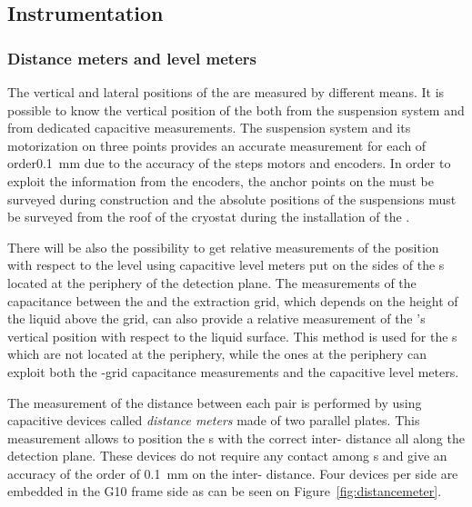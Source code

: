\subsection{Instrumentation}
\label{sec:fddp-crp-instr}

\subsubsection{Distance meters and level meters}

The vertical and lateral positions of the  are measured by different means. 
It is possible to know the vertical position of the  both from the suspension system and from dedicated capacitive measurements.
The  suspension system and its motorization on three points provides an accurate measurement for each  of order\SI{0.1}{mm} due to the accuracy of the steps motors and encoders. 
In order to exploit the information from the encoders,  the anchor points on the  must be surveyed during construction and the absolute positions of the suspensions must be surveyed from the roof of the cryostat during the installation of the \fdth.

There will be also the possibility to get relative measurements of the  position with respect to the \lar level using capacitive level meters put on the sides of the s located at the periphery of the detection plane.  The  measurements of the capacitance between the  and the extraction grid, which depends on the height of the liquid above the grid, can also provide a relative measurement  of the 's vertical position with respect to the liquid surface. This method is used for the s which are not located at the periphery, while the ones at the periphery can exploit both the  -grid capacitance measurements and the capacitive level meters.
 
 
The measurement of the distance between each  pair is performed by using capacitive devices called \textit{distance meters} made of two parallel plates. %
This measurement allows to position the s with the correct  inter- distance all along the detection plane. These devices do not require any contact among  s and give an accuracy of the order of \SI{0.1}{mm} on the  inter- distance.  Four devices per  side are embedded in the G10 frame side as can be seen on Figure~\ref{fig:distancemeter}.

